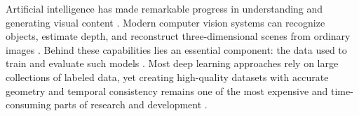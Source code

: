 




Artificial intelligence has made remarkable progress in understanding and generating visual content \cite{lecun2015deep, krizhevsky2012imagenet}. Modern computer vision systems can recognize objects, estimate depth, and reconstruct three-dimensional scenes from ordinary images \cite{he2017mask, zollhoefer2018state}. Behind these capabilities lies an essential component: the data used to train and evaluate such models \cite{sun2017revisiting}. Most deep learning approaches rely on large collections of labeled data, yet creating high-quality datasets with accurate geometry and temporal consistency remains one of the most expensive and time-consuming parts of research and development \cite{everingham2010pascal, lin2014microsoft}.

